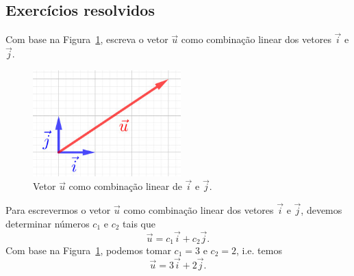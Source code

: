 \subsection*{Exercícios resolvidos}

\begin{exeresol}\label{exeresol:comblin_geo}
  Com base na Figura~\ref{cap_base_sec_comblin:fig:comblin_exeresol_geo}, escreva o vetor $\vec{u}$ como combinação linear dos vetores $\vec{i}$ e $\vec{j}$.

  \begin{figure}[H]
    \centering
    \includegraphics[width=2.25in]{cap_base/dados/fig_comblin_exeresol_geo/fig.jpg}
    \caption{Vetor $\vec{u}$ como combinação linear de $\vec{i}$ e $\vec{j}$.}
    \label{cap_base_sec_comblin:fig:comblin_exeresol_geo}
  \end{figure}

\end{exeresol}
\begin{resol}
  Para escrevermos o vetor $\vec{u}$ como combinação linear dos vetores $\vec{i}$ e $\vec{j}$, devemos determinar números $c_1$ e $c_2$ tais que
  \begin{equation}
    \vec{u} = c_1\vec{i} + c_2\vec{j}.
  \end{equation}
  Com base na Figura~\ref{cap_base_sec_comblin:fig:comblin_exeresol_geo}, podemos tomar $c_1 = 3$ e $c_2=2$, i.e. temos
  \begin{equation}
    \vec{u} = 3\vec{i} + 2\vec{j}.
  \end{equation}
\end{resol}

